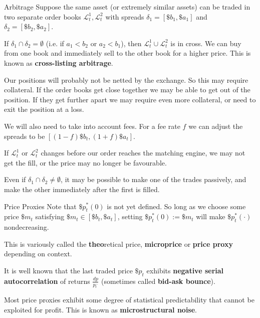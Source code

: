 \documentclass{beamer}
\begin{document}
\begin{frame}{Arbitrage}
	Suppose the same asset (or extremely similar assets) can be traded in two separate order books $\mathcal{L}_t^1, \mathcal{L}_t^2$ with spreads $\delta_1 = [\$b_1,\$a_1]$ and $\delta_2 = [\$b_2, \$a_2]$.

	If $\delta_1\cap\delta_2=\emptyset$ (i.e. if $a_1<b_2$ or $a_2<b_1$), then $\mathcal{L}_t^1\cup\mathcal{L}_t^2$ is in cross. We can buy from one book and immediately sell to the other book for a higher price. This is known as \textbf{cross-listing arbitrage}.

	Our positions will probably not be netted by the exchange. So this may require collateral. If the order books get close together we may be able to get out of the position. If they get further apart we may require even more collateral, or need to exit the position at a loss.%

	We will also need to take into account fees. For a fee rate $f$ we can adjust the spreads to be $[(1-f)\$b_t,(1+f)\$a_t]$.

	If $\mathcal{L}_t^1$ or $\mathcal{L}_t^2$ changes before our order reaches the matching engine, we may not get the fill, or the price may no longer be favourable.

	Even if $\delta_1\cap\delta_2\not=\emptyset$, it may be possible to make one of the trades passively, and make the other immediately after the first is filled.%
\end{frame}

\begin{frame}{Price Proxies}
	Note that $\$p^*_t(0)$ is not yet defined. So long as we choose some price $\$m_t$ satisfying $\$m_t\in[\$b_t,\$a_t]$, setting $\$p^*_t(0) := \$m_t$ will make $\$p^*_t(\cdot)$ nondecreasing.

	This is variously called the \textbf{theo}retical price, \textbf{microprice} or \textbf{price proxy} depending on context.

	\pause

	It is well known that the last traded price $\$p_t$ exhibits \textbf{negative serial autocorrelation} of returns $\frac{dp}{p_t^-}$ (sometimes called \textbf{bid-ask bounce}).

	Most price proxies exhibit some degree of statistical predictability that cannot be exploited for profit. This is known as \textbf{microstructural noise}.

\end{frame}
\end{document}
